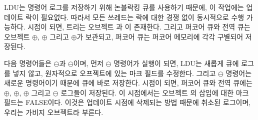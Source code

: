 LDU는 명령어 로그를 저장하기 위해 논블락킹 큐를 사용하기 때문에, 이 작업에는 업데이트 락이 필요없다.
따라서 모든 쓰레드는 락에 대한 경쟁 없이 동시적으로 수행 가능하다.
 시점이 되면, 트리는 오브젝트 과 이 존재한다.
그리고 퍼코어 큐와 전역 큐는 오브젝트 $\oplus$, $\oplus$ 그리고
$\oplus$가 보관되고, 퍼코어 큐는 퍼코어 메모리에 각각 구별되어 저장된다.

다음 명령어들은 $\ominus$과 $\ominus$이며,
먼저 $\ominus$ 명령어가 실행이 되면, LDU는 새롭게 큐에 로그를 넣지 않고, 
원자적으로 오프젝트에 있는 마크 필드를 수정한다. 
그리고 $\ominus$ 명령어는 새로운 명령어이기 때문에 큐에 바로 저장한다. 
 시점이 되면, 퍼코어 큐와 전역 큐에는 $\oplus$, $\oplus$,
$\oplus$ 그리고 $\ominus$ 로그들이 저장된다. 
이 시점에서는 오브젝트 의 삽입에 대한 마크 필드는 FALSE이다. 
이것은 업데이트 시점에 삭제되는 방법 때문에 취소된 로그이며, 우리는
가비지 오브젝트라 부른다.


